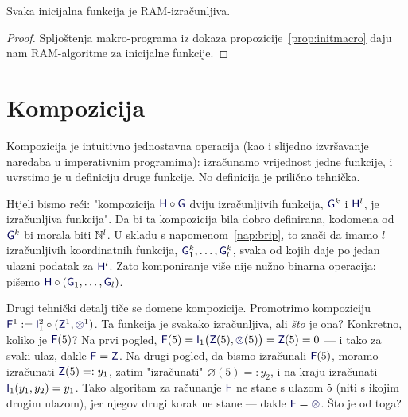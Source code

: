 \begin{korolar}[{name=[RAM-izračunljivost inicijalnih funkcija]}]\label{kor:initram}
Svaka inicijalna funkcija je RAM-izračunljiva.
\end{korolar}
\begin{proof}
Spljoštenja makro-programa iz dokaza propozicije~\ref{prop:initmacro} daju nam RAM-algoritme za inicijalne funkcije.
\end{proof}

\section{Kompozicija}

Kompozicija je intuitivno jednostavna operacija (kao i slijedno izvršavanje naredaba u imperativnim programima): izračunamo vrijednost jedne funkcije, i uvrstimo je u definiciju druge funkcije. No definicija je prilično tehnička.%

Htjeli bismo reći: "kompozicija $\f H\circ\f G$ dviju izračunljivih funkcija, $\f G^k$ i $\f H^l$, je izračunljiva funkcija". Da bi ta kompozicija bila dobro definirana, kodomena od $\f G^k$ bi morala biti ${\mathbb N}^l$. U skladu s napomenom~\ref{nap:brip}, to znači da imamo $l$ izračunljivih koordinatnih funkcija, $\f G_1^k,\dotsc,\f G_l^k$, svaka od kojih daje po jedan ulazni podatak za $\f H^l$. Zato komponiranje više nije nužno binarna operacija: pišemo $\f H\circ(\f G_1,\dotsc,\f G_l)$.

Drugi tehnički detalj tiče se domene kompozicije. Promotrimo kompoziciju $\f F^1:=\f I_1^2\circ(\f Z^1,\varnothing^1)$. Ta funkcija je svakako izračunljiva, ali \emph{što} je ona? Konkretno, koliko je $\f F(5)$? Na prvi pogled, $\f F(5)=\f I_1\bigl(\f Z(5),\varnothing(5)\bigr)=\f Z(5)=0$ --- i tako za svaki ulaz, dakle $\f F =\f Z$. Na drugi pogled, da bismo izračunali $\f F(5)$, moramo izračunati $\f Z(5)=:y_1$, zatim "izračunati" $\varnothing(5)=:y_2$, i na kraju izračunati $\f I_1(y_1,y_2)=y_1$. Tako algoritam za računanje $\f F$ ne stane s ulazom $5$ (niti s ikojim drugim ulazom), jer njegov drugi korak ne stane --- dakle $\f F=\varnothing$. Što je od toga?


